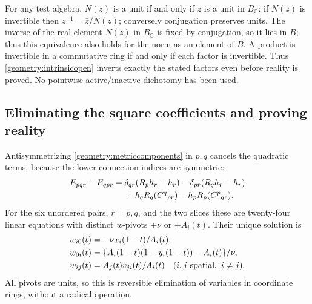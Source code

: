 \documentclass[11pt,a4paper]{article}
\theoremstyle{remark}\newtheorem{remark}[theorem]{Remark}
\begin{document}
For any test algebra, \(N(z)\) is a unit if and only if \(z\) is a unit
in \(B_{\mathbb C}\): if \(N(z)\) is invertible then
\(z^{-1}=\bar z/N(z)\); conversely conjugation preserves units.
The inverse of the real element $N(z)$ in $B_{\mathbb C}$ is fixed
by conjugation, so it lies in $B$; thus this equivalence also holds for
the norm as an element of $B$.
A product is invertible in a commutative ring if and only if each factor
is invertible. Thus \eqref{geometry:intrinsicopen} inverts exactly the
stated factors even before reality is proved. No pointwise active/inactive
dichotomy has been used.

\subsection{Eliminating the square coefficients and proving reality}

Antisymmetrizing \eqref{geometry:metriccomponents} in \(p,q\) cancels
the quadratic terms, because the lower connection indices are symmetric:
\begin{align}
 E_{pqr}-E_{qpr}
  ={}&\delta_{qr}(R_ph_r-h_r)-\delta_{pr}(R_qh_r-h_r)\notag\\
     &+h_qR_q(C^q{}_{pr})-h_pR_p(C^p{}_{qr}).
 \label{geometry:antisym}
\end{align}
For the six unordered pairs, \(r=p,q\), and the two slices these are
twenty-four linear equations with distinct \(w\)-pivots
\(\pm\nu\) or \(\pm A_i(t)\). Their unique solution is
\begin{align}
 w_{i0}(t)&=-\nu x_i(1-t)/A_i(t),\notag\\
 w_{0i}(t)&=\{A_i(1-t)(1-y_i(1-t))-A_i(t)\}/\nu,\notag\\
 w_{ij}(t)&=A_j(t)v_{ji}(t)/A_i(t)\quad(i,j\text{ spatial},\ i\ne j).
 \label{geometry:wreconstruction}
\end{align}
All pivots are units, so this is reversible elimination of variables in
coordinate rings, without a radical operation.
\end{document}
